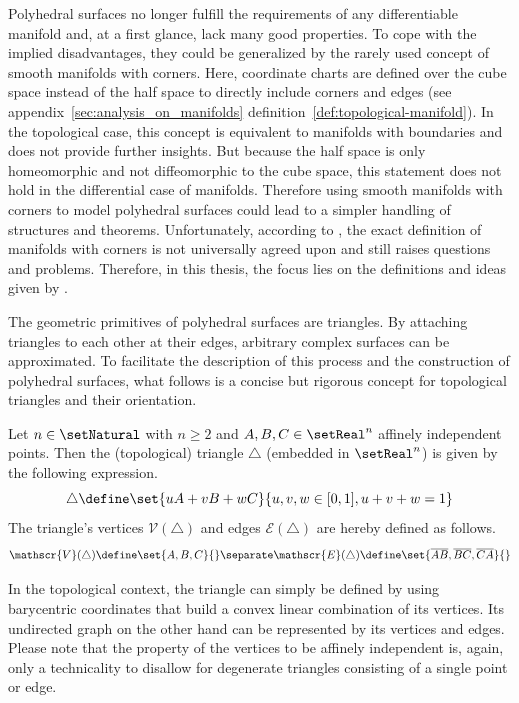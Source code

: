 \documentclass{stdlocal}
\begin{document}
  Polyhedral surfaces no longer fulfill the requirements of any differentiable manifold and, at a first glance, lack many good properties.
  To cope with the implied disadvantages, they could be generalized by the rarely used concept of smooth manifolds with corners.
  Here, coordinate charts are defined over the cube space instead of the half space to directly include corners and edges (see appendix~\ref{sec:analysis_on_manifolds} definition~\ref{def:topological-manifold}).
  In the topological case, this concept is equivalent to manifolds with boundaries and does not provide further insights.
  But because the half space is only homeomorphic and not diffeomorphic to the cube space, this statement does not hold in the differential case of manifolds.
  Therefore using smooth manifolds with corners to model polyhedral surfaces could lead to a simpler handling of structures and theorems.
  Unfortunately, according to \textcite{joyce2009}, the exact definition of manifolds with corners is not universally agreed upon and still raises questions and problems.
  Therefore, in this thesis, the focus lies on the definitions and ideas given by \textcite{polthier2006}.

  The geometric primitives of polyhedral surfaces are triangles.
  By attaching triangles to each other at their edges, arbitrary complex surfaces can be approximated.
  To facilitate the description of this process and the construction of polyhedral surfaces, what follows is a concise but rigorous concept for topological triangles and their orientation.

  \begin{definition}[Triangle]
    Let $n\in\setNatural$ with $n\geq 2$ and $A,B,C\in\setReal^n$ affinely independent points.
    Then the (topological) triangle $\triangle$ (embedded in $\setReal^n$) is given by the following expression.
    \[
      \triangle \define \set{uA + vB + wC}{u,v,w\in[0,1], u+v+w=1}
    \]
    The triangle's vertices $\mathscr{V}(\triangle)$ and edges $\mathscr{E}(\triangle)$ are hereby defined as follows.
    \[
      \mathscr{V}(\triangle) \define \set{A,B,C}{}
      \separate
      \mathscr{E}(\triangle) \define \set{\overline{AB}, \overline{BC}, \overline{CA}}{}
    \]
  \end{definition}
  In the topological context, the triangle can simply be defined by using barycentric coordinates that build a convex linear combination of its vertices.
  Its undirected graph on the other hand can be represented by its vertices and edges.
  Please note that the property of the vertices to be affinely independent is, again, only a technicality to disallow for degenerate triangles consisting of a single point or edge.
\end{document}
